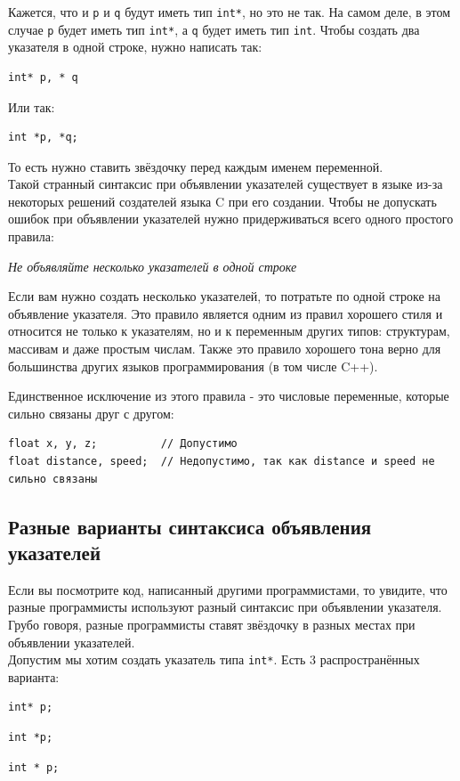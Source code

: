 \documentclass[10pt]{article}
\begin{document}
Кажется, что и \texttt{p} и \texttt{q} будут иметь тип \texttt{int*}, но это не так.
На самом деле, в этом случае \texttt{p} будет иметь тип \texttt{int*}, а \texttt{q} будет иметь тип \texttt{int}.
Чтобы создать два указателя в одной строке, нужно написать так:
\begin{lstlisting}
int* p, * q
\end{lstlisting}
Или так:
\begin{lstlisting}
int *p, *q;
\end{lstlisting}
То есть нужно ставить звёздочку перед каждым именем переменной.\\

Такой странный синтаксис при объявлении указателей существует в языке из-за некоторых
решений создателей языка C при его создании. Чтобы не допускать ошибок при объявлении указателей нужно придерживаться всего одного простого правила:

\begin{center}
\textit{Не объявляйте несколько указателей в одной строке}
\end{center}

Если вам нужно создать несколько указателей, то потратьте по одной строке на объявление указателя.
Это правило является одним из правил хорошего стиля и относится не только к указателям, но и к переменным других типов: структурам, массивам и даже простым числам. Также это правило хорошего тона верно для большинства других языков программирования (в том числе C++).

Единственное исключение из этого правила - это числовые переменные, которые сильно связаны друг с другом:
\begin{lstlisting}
float x, y, z;          // Допустимо
float distance, speed;  // Недопустимо, так как distance и speed не сильно связаны
\end{lstlisting}


\subsection*{Разные варианты синтаксиса объявления указателей}
Если вы посмотрите код, написанный другими программистами, то увидите, что разные программисты используют разный синтаксис при объявлении указателя. Грубо говоря, разные программисты ставят звёздочку в разных местах при объявлении указателей.\\
Допустим мы хотим создать указатель типа \texttt{int*}. Есть 3 распространённых варианта:
\begin{multicols}{3}
\noindent
\begin{lstlisting}
int* p;
\end{lstlisting}

\begin{lstlisting}
int *p;
\end{lstlisting}

\begin{lstlisting}
int * p;
\end{lstlisting}

\end{multicols}
\end{document}
